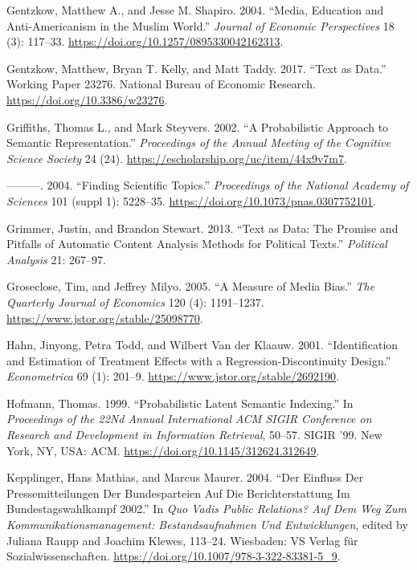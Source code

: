 \documentclass[
]{article}
\begin{document}
\leavevmode\hypertarget{ref-gentzkow_media_2004}{}%
Gentzkow, Matthew A., and Jesse M. Shapiro. 2004. ``Media, Education and
Anti-Americanism in the Muslim World.'' \emph{Journal of Economic
Perspectives} 18 (3): 117--33.
\url{https://doi.org/10.1257/0895330042162313}.

\leavevmode\hypertarget{ref-gentzkow_text_2017}{}%
Gentzkow, Matthew, Bryan T. Kelly, and Matt Taddy. 2017. ``Text as
Data.'' Working Paper 23276. National Bureau of Economic Research.
\url{https://doi.org/10.3386/w23276}.

\leavevmode\hypertarget{ref-griffiths_probabilistic_2002}{}%
Griffiths, Thomas L., and Mark Steyvers. 2002. ``A Probabilistic
Approach to Semantic Representation.'' \emph{Proceedings of the Annual
Meeting of the Cognitive Science Society} 24 (24).
\url{https://escholarship.org/uc/item/44x9v7m7}.

\leavevmode\hypertarget{ref-griffiths_finding_2004}{}%
---------. 2004. ``Finding Scientific Topics.'' \emph{Proceedings of the
National Academy of Sciences} 101 (suppl 1): 5228--35.
\url{https://doi.org/10.1073/pnas.0307752101}.

\leavevmode\hypertarget{ref-grimmer_text_2013}{}%
Grimmer, Justin, and Brandon Stewart. 2013. ``Text as Data: The Promise
and Pitfalls of Automatic Content Analysis Methods for Political
Texts.'' \emph{Political Analysis} 21: 267--97.

\leavevmode\hypertarget{ref-groseclose_measure_2005}{}%
Groseclose, Tim, and Jeffrey Milyo. 2005. ``A Measure of Media Bias.''
\emph{The Quarterly Journal of Economics} 120 (4): 1191--1237.
\url{https://www.jstor.org/stable/25098770}.

\leavevmode\hypertarget{ref-hahn_identification_2001}{}%
Hahn, Jinyong, Petra Todd, and Wilbert Van der Klaauw. 2001.
``Identification and Estimation of Treatment Effects with a
Regression-Discontinuity Design.'' \emph{Econometrica} 69 (1): 201--9.
\url{https://www.jstor.org/stable/2692190}.

\leavevmode\hypertarget{ref-hofmann_probabilistic_1999}{}%
Hofmann, Thomas. 1999. ``Probabilistic Latent Semantic Indexing.'' In
\emph{Proceedings of the 22Nd Annual International ACM SIGIR Conference
on Research and Development in Information Retrieval}, 50--57. SIGIR
'99. New York, NY, USA: ACM.
\url{https://doi.org/10.1145/312624.312649}.

\leavevmode\hypertarget{ref-kepplinger_einfluss_2004}{}%
Kepplinger, Hans Mathias, and Marcus Maurer. 2004. ``Der Einfluss Der
Pressemitteilungen Der Bundesparteien Auf Die Berichterstattung Im
Bundestagswahlkampf 2002.'' In \emph{Quo Vadis Public Relations? Auf Dem
Weg Zum Kommunikationsmanagement: Bestandsaufnahmen Und Entwicklungen},
edited by Juliana Raupp and Joachim Klewes, 113--24. Wiesbaden: VS
Verlag für Sozialwissenschaften.
\url{https://doi.org/10.1007/978-3-322-83381-5_9}.
\end{document}
